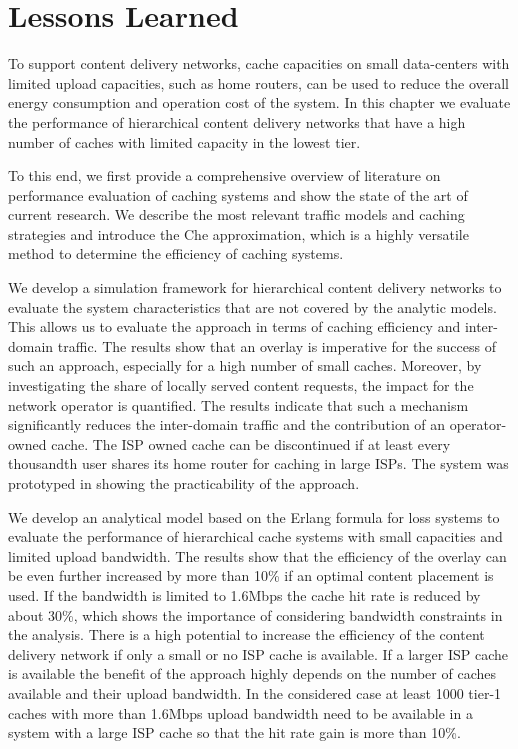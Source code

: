 \section{Lessons Learned}\label{sec:cloud:lessons_learned}
To support content delivery networks, cache capacities on small data-centers with limited upload capacities, such as home routers, can be used to reduce the overall energy consumption and operation cost of the system.
In this chapter we evaluate the performance of hierarchical content delivery networks that have a high number of caches with limited capacity in the lowest tier.

To this end, we first provide a comprehensive overview of literature on performance evaluation of caching systems and show the state of the art of current research.
We describe the most relevant traffic models and caching strategies and introduce the Che approximation, which is a highly versatile method to determine the efficiency of caching systems.

We develop a simulation framework for hierarchical content delivery networks to evaluate the system characteristics that are not covered by the analytic models.
This allows us to evaluate the approach in terms of caching efficiency and inter-domain traffic.
The results show that an overlay is imperative for the success of such an approach, especially for a high number of small caches.
Moreover, by investigating the share of locally served content requests, the impact for the network operator is quantified.
The results indicate that such a mechanism significantly reduces the inter-domain traffic and the contribution of an operator-owned cache.
The ISP owned cache can be discontinued if at least every thousandth user shares its home router for caching in large ISPs.
The system was prototyped in \cite{rbhorst-demo} showing the practicability of the approach.

We develop an analytical model based on the Erlang formula for loss systems to evaluate the performance of hierarchical cache systems with small capacities and limited upload bandwidth.
The results show that the efficiency of the overlay can be even further increased by more than 10\% if an optimal content placement is used.
If the bandwidth is limited to 1.6Mbps the cache hit rate is reduced by about 30\%, which shows the importance of considering bandwidth constraints in the analysis.
There is a high potential to increase the efficiency of the content delivery network if only a small or no ISP cache is available.
If a larger ISP cache is available the benefit of the approach highly depends on the number of caches available and their upload bandwidth.
In the considered case at least 1000 tier-1 caches with more than 1.6Mbps upload bandwidth need to be available in a system with a large ISP cache so that the hit rate gain is more than 10\%.


